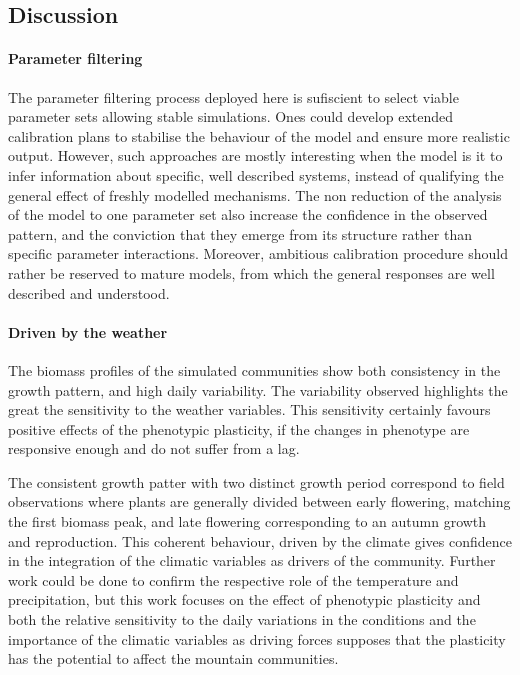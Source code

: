 \subsection{Discussion}

\paragraph{Parameter filtering}

The parameter filtering process deployed here is sufiscient to select viable parameter sets allowing stable simulations. Ones could develop extended calibration plans to stabilise the behaviour of the model and ensure more realistic output. However, such approaches are mostly interesting when the model is it to infer information about specific, well described systems, instead of qualifying the general effect of freshly modelled mechanisms. The non reduction of the analysis of the model to one parameter set also increase the confidence in the observed pattern, and the conviction that they emerge from its structure rather than specific parameter interactions. Moreover, ambitious calibration procedure should rather be reserved to mature models, from which the general responses are well described and understood.

\paragraph{Driven by the weather}

The biomass profiles of the simulated communities show both consistency in the growth pattern, and high daily variability. The variability observed highlights the great the sensitivity to the weather variables. This sensitivity certainly favours positive effects of the phenotypic plasticity, if the changes in phenotype are responsive enough and do not suffer from a lag.

The consistent growth patter with two distinct growth period correspond to field observations where plants are generally divided between early flowering, matching the first biomass peak, and late flowering corresponding to an autumn growth and reproduction. This coherent behaviour, driven by the climate gives confidence in the integration of the climatic variables as drivers of the community. Further work could be done to confirm the respective role of the temperature and precipitation, but this work focuses on the effect of phenotypic plasticity and both the relative sensitivity to the daily variations in the conditions and the importance of the climatic variables as driving forces supposes that the plasticity has the potential to affect the mountain communities.

